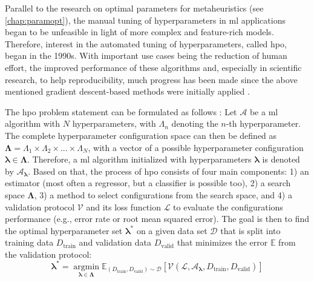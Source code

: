 Parallel to the research on optimal parameters for metaheuristics (see \ref{chap:paramopt}), the manual tuning of hyperparameters in \gls{ml} applications began to be unfeasible in light of more complex and feature-rich models. Therefore, interest in the automated tuning of hyperparameters, called \gls{hpo}, began in the 1990s. With important use cases being the reduction of human effort, the improved performance of these algorithms and, especially in scientific research, to help reproducibility, much progress has been made since the above mentioned gradient descent-based methods were initially applied  \cite{feurer2019hyperparameter}. 

The \gls{hpo} problem statement can be formulated as follows \cite{feurer2019hyperparameter}:
Let $\mathcal{A}$ be a \gls{ml} algorithm with $N$ hyperparameters, with $\Lambda_n$ denoting the $n$-th hyperparameter. The complete hyperparameter configuration space can then be defined as $\mathbf{\Lambda} = \Lambda_1 \times \Lambda_2 \times ... \times \Lambda_N$, with a vector of a possible hyperparameter configuration $\mathbf{\lambda} \in \mathbf{\Lambda}$. Therefore, a \gls{ml} algorithm initialized with hyperparameters $\mathbf{\lambda}$ is denoted by $\mathcal{A}_\mathbf{\lambda}$.
Based on that, the process of \gls{hpo} consists of four main components: 1) an estimator (most often a regressor, but a classifier is possible too), 2) a search space $\mathbf{\Lambda}$, 3) a method to select configurations from the search space, and 4) a validation protocol $\mathcal{V}$ and its loss function $\mathcal{L}$ to evaluate the configurations performance (e.g., error rate or root mean squared error). 
The goal is then to find the optimal hyperparameter set $\mathbf{\lambda^*}$ on a given data set $\mathcal{D}$ that is split into training data $D_\text{train}$ and validation data $D_\text{valid}$ that minimizes the error $\mathbb{E}$ from the validation protocol:
\begin{equation}
	\label{eq:hpo}
	\mathbf{\lambda^*} = \operatorname*{argmin}_{\mathbf{\lambda} \in \mathbf{\Lambda}} \mathbb{E}_{(D_\text{train}, D_\text{valid}) \sim \mathcal{D}} \left[ \mathcal{V}(\mathcal{L}, \mathcal{A}_\mathbf{\lambda}, D_\text{train}, D_\text{valid}) \right] 
\end{equation}

